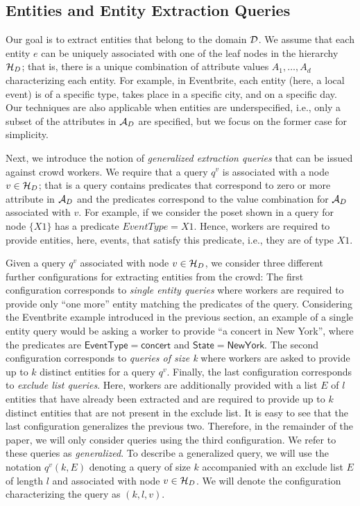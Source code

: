 \subsection{Entities and Entity Extraction Queries}
\label{sec:queries}

 Our goal is to extract entities that belong to the domain $\mathcal{D}$. We assume that each entity $e$ can be uniquely associated with one of the leaf nodes in the hierarchy $\mathcal{H}_D$; that is, there is a unique combination of attribute values $A_1, \ldots, A_d$ characterizing each entity. For example, in Eventbrite, each entity (here, a local event) is of a specific type, takes place in a specific city, and on a specific day. Our techniques are also applicable when entities are underspecified, i.e., only a subset of the attributes in $\mathcal{A}_D$ are specified, but we focus on the former case for simplicity.

 Next, we introduce the notion of {\em generalized extraction queries} that can be issued against crowd workers. We require that a query $q^v$ is associated with a node $v \in \mathcal{H}_D$; that is a query contains predicates that correspond to zero or more attribute in $\mathcal{A}_D$ and the predicates correspond to the value combination for $\mathcal{A}_D$ associated with $v$. For example, if we consider the poset shown in  a query for node $\{X1\}$ has a predicate $EventType = X1$. Hence, workers are required to provide entities, here, events, that satisfy this predicate, i.e., they are of type $X1$.

Given a query $q^v$ associated with node $v \in \mathcal{H}_D$, we consider three different further configurations for  extracting entities from the crowd: The first configuration corresponds to {\em single entity queries} where workers are required to provide only ``one more'' entity matching the predicates of the query. Considering the Eventbrite example introduced in the previous section, an example of a single entity query would be asking a worker to provide ``a concert in New York'', where the predicates are $\mathsf{EventType = concert}$ and $\mathsf{State = New York}$. The second configuration corresponds to {\em queries of size k} where workers are asked to provide up to $k$ distinct entities for a query $q^v$. Finally, the last configuration corresponds to {\em exclude list queries}. Here,  workers are additionally provided with a list $E$ of $l$ entities that have already been extracted and are required to provide up to $k$ distinct entities that are not present in the exclude list. It is easy to see that the last configuration generalizes the previous two. Therefore, in the remainder of the paper, we will only consider queries using the third configuration. We refer to these queries as {\em generalized}. To describe a generalized query, we will use the notation $q^v(k,E)$ denoting a query of size $k$ accompanied with an exclude list $E$ of length $l$ and associated with node $v \in \mathcal{H}_D$. We will denote the configuration characterizing the query as $(k,l,v)$. 

